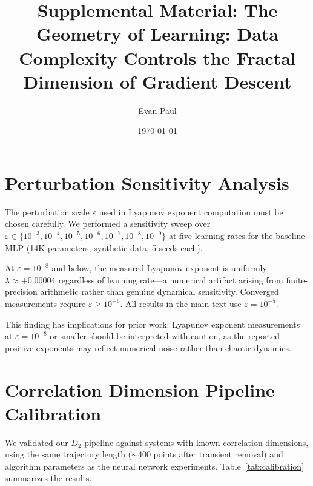 \documentclass[aps,prl,twocolumn,superscriptaddress]{revtex4-2}
\begin{document}
\title{Supplemental Material: The Geometry of Learning: Data Complexity Controls the Fractal Dimension of Gradient Descent}

\author{Evan Paul}

\date{\today}

\maketitle

\section{Perturbation Sensitivity Analysis}

The perturbation scale $\varepsilon$ used in Lyapunov exponent computation must be chosen carefully. We performed a sensitivity sweep over $\varepsilon \in \{10^{-3}, 10^{-4}, 10^{-5}, 10^{-6}, 10^{-7}, 10^{-8}, 10^{-9}\}$ at five learning rates for the baseline MLP (14K parameters, synthetic data, 5 seeds each).

At $\varepsilon = 10^{-8}$ and below, the measured Lyapunov exponent is uniformly $\lambda \approx +0.00004$ regardless of learning rate---a numerical artifact arising from finite-precision arithmetic rather than genuine dynamical sensitivity. Converged measurements require $\varepsilon \geq 10^{-6}$. All results in the main text use $\varepsilon = 10^{-5}$.

This finding has implications for prior work: Lyapunov exponent measurements at $\varepsilon = 10^{-8}$ or smaller should be interpreted with caution, as the reported positive exponents may reflect numerical noise rather than chaotic dynamics.

\section{Correlation Dimension Pipeline Calibration}

We validated our $D_2$ pipeline against systems with known correlation dimensions, using the same trajectory length (${\sim}400$ points after transient removal) and algorithm parameters as the neural network experiments. Table~\ref{tab:calibration} summarizes the results.
\end{document}
